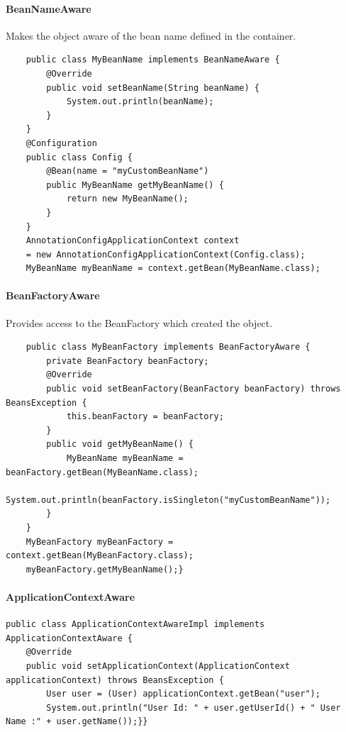 \documentclass{scrartcl}
\begin{document}
\paragraph{BeanNameAware}

Makes the object aware of the bean name defined in the container.

\begin{lstlisting}
    public class MyBeanName implements BeanNameAware {
        @Override
        public void setBeanName(String beanName) {
            System.out.println(beanName);
        }
    }
    @Configuration
    public class Config {
        @Bean(name = "myCustomBeanName")
        public MyBeanName getMyBeanName() {
            return new MyBeanName();
        }
    }
    AnnotationConfigApplicationContext context
    = new AnnotationConfigApplicationContext(Config.class);
    MyBeanName myBeanName = context.getBean(MyBeanName.class);

\end{lstlisting}

\paragraph{BeanFactoryAware}

Provides access to the BeanFactory which created the object.

\begin{lstlisting}
    public class MyBeanFactory implements BeanFactoryAware {
        private BeanFactory beanFactory;
        @Override
        public void setBeanFactory(BeanFactory beanFactory) throws BeansException {
            this.beanFactory = beanFactory;
        }
        public void getMyBeanName() {
            MyBeanName myBeanName = beanFactory.getBean(MyBeanName.class);
            System.out.println(beanFactory.isSingleton("myCustomBeanName"));
        }
    }
    MyBeanFactory myBeanFactory = context.getBean(MyBeanFactory.class);
    myBeanFactory.getMyBeanName();}
    \end{lstlisting}

    \paragraph{ApplicationContextAware}
    \begin{lstlisting}
public class ApplicationContextAwareImpl implements ApplicationContextAware {
    @Override
    public void setApplicationContext(ApplicationContext applicationContext) throws BeansException {
        User user = (User) applicationContext.getBean("user");
        System.out.println("User Id: " + user.getUserId() + " User Name :" + user.getName());}}
        \end{lstlisting}
\end{document}
